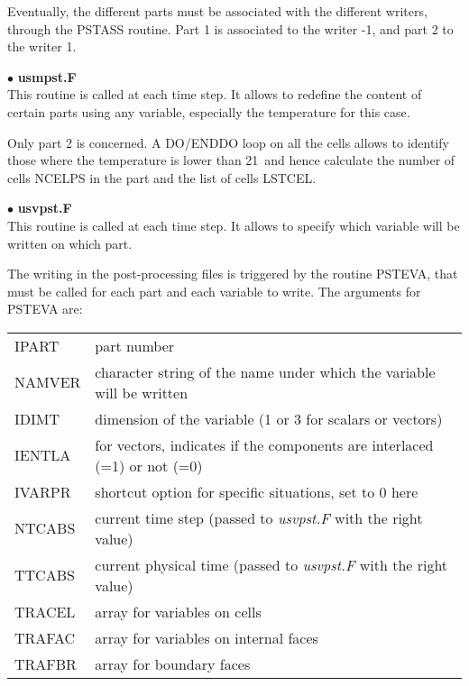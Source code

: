 Eventually, the different parts must be associated with the different writers,
through the PSTASS routine. Part 1 is associated to the writer -1, and part 2 to
the writer 1.


$\bullet$ {\bfseries usmpst.F}\\
This routine is called at each time step. It allows to redefine the content of
certain parts using any variable, especially the temperature for this case.

Only part 2 is concerned. A DO/ENDDO loop on all the cells allows to identify those
where the temperature is lower than 21\degresC\ and hence calculate the number
of cells NCELPS in the part and the list of cells LSTCEL.


$\bullet$ {\bfseries usvpst.F}\\
This routine is called at each time step. It allows to specify which variable
will be written on which part.

The writing in the post-processing files is triggered by the routine PSTEVA,
that must be called for each part and each variable to write. The arguments for
PSTEVA are:

\begin{tabular}{@{$\bullet\ $}l@{$\quad$}p{10cm}}
IPART & part number\\
NAMVER & character string of the name under which the variable will be written\\
IDIMT & dimension of the variable (1 or 3 for scalars or vectors)\\
IENTLA & for vectors, indicates if the components are interlaced (=1) or not
(=0)\\
IVARPR & shortcut option for specific situations, set to 0 here\\
NTCABS & current time step (passed to {\itshape usvpst.F} with the right value)\\
TTCABS & current physical time (passed to {\itshape usvpst.F} with the right
value)\\
TRACEL & array for variables on cells\\
TRAFAC & array for variables on internal faces\\
TRAFBR & array for boundary faces
\end{tabular}



